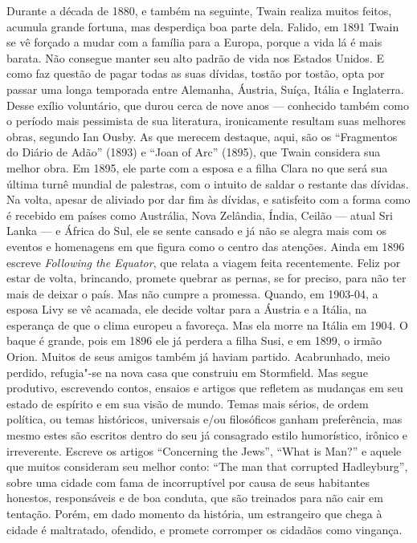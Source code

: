 Durante a década de 1880, e também na seguinte, Twain realiza
muitos feitos, acumula grande fortuna, mas desperdiça boa parte dela.
Falido, em 1891 Twain se vê forçado a mudar com a família para a
Europa, porque a vida lá é mais barata. Não consegue manter seu alto padrão
de vida nos Estados Unidos. E como faz questão de pagar todas as
suas dívidas, tostão por tostão, opta por passar uma longa temporada entre
Alemanha, Áustria, Suíça, Itália e Inglaterra. Desse exílio voluntário, que durou
cerca de nove anos --- conhecido também como o período mais
pessimista de sua literatura, ironicamente resultam suas melhores obras,
segundo Ian Ousby. As que merecem destaque, aqui, são os “Fragmentos do
Diário de Adão” (1893) e “Joan of Arc” (1895), que Twain considera sua melhor
obra. Em 1895, ele parte com a esposa e a filha Clara no que será sua
última turnê mundial de palestras, com o intuito de saldar o restante das
dívidas. Na volta, apesar de aliviado por dar fim às dívidas, e
satisfeito com a forma como é recebido em países como Austrália, Nova
Zelândia, Índia, Ceilão --- atual Sri Lanka --- e África do Sul, ele se sente
cansado e já não se alegra mais com os eventos e homenagens em que figura como
o centro das atenções. Ainda em 1896 escreve \textit{Following the Equator}, que
relata a viagem feita recentemente. Feliz por estar de volta, brincando, 
promete quebrar as pernas, se for preciso, para não ter mais de deixar o
país. Mas não cumpre a promessa. Quando, em 1903-04, a esposa Livy se vê
acamada, ele decide voltar para a Áustria e a Itália, na esperança de que
o clima europeu a favoreça. Mas ela morre na Itália em 1904. O baque é
grande, pois em 1896 ele já perdera a filha Susi, e em 1899, o irmão Orion.
Muitos de seus amigos também já haviam partido. Acabrunhado, meio
perdido, refugia"-se na nova casa que construiu em Stormfield. Mas segue
produtivo, escrevendo contos, ensaios e artigos que refletem as mudanças
em seu estado de espírito e em sua visão de mundo. Temas mais sérios, de ordem
política, ou temas históricos, universais e/ou filosóficos ganham
preferência, mas mesmo estes são escritos dentro do seu já consagrado
estilo humorístico, irônico e irreverente. Escreve os artigos
``Concerning the Jews'', ``What is Man?'' e aquele que muitos consideram seu melhor conto:
``The man that corrupted Hadleyburg'', sobre uma
cidade com fama de incorruptível por causa de seus habitantes honestos,
responsáveis e de boa conduta, que são treinados para não cair
em tentação. Porém, em dado momento da história, um estrangeiro que
chega à cidade é maltratado, ofendido, e promete corromper os cidadãos
como vingança.

